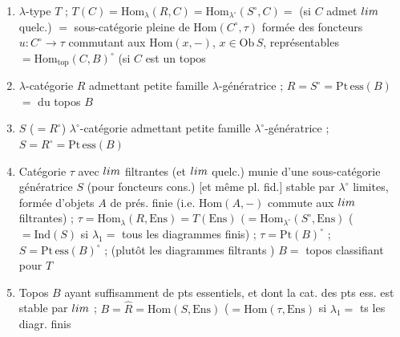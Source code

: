 \documentclass[11pt,a4paper]{article}
\begin{document}
\begin{enumerate}
  \item[{[T]}] $\lambda$-type $T$ ; $T(C) = \mathrm{Hom}_{\lambda}(R, C) =
    \mathrm{Hom}_{\lambda^{\circ}}(S^{\circ}, C) = $  (si $C$ admet $\varprojlim$ quelc.) $= $ sous-catégorie
    pleine de $\mathrm{Hom}(C^{\circ}, \tau)$ formée des foncteurs $u :
    C^{\circ} \to \tau$ commutant aux \ill{} $\mathrm{Hom}(x, -)$, $x \in
    \mathrm{Ob}\,S$, \ill{} représentables $= \mathrm{Hom}_{\mathrm{top}}
    (C, B)^{\circ}$ (si $C$ est un topos
  \item[{[R]}] $\lambda$-catégorie $R$ \struck{\ill{}} admettant petite
    famille $\lambda$-génératrice ; $R = S^{\circ} = \mathrm{Pt\,ess}(B)$
     $= $
    \struck{\ill{}} \ill{}  \ill{} du topos $B$
  \item[{[S]}] $S$ ($= R^{\circ}$) $\lambda^{\circ}$-catégorie admettant
    petite famille $\lambda^{\circ}$-génératrice ; $S = R^{\circ} =
    \mathrm{Pt\,ess}(B)$ 
  \item[{[$\tau$]}] Catégorie $\tau$ avec $\varinjlim$ filtrantes (et
    $\varprojlim$ quelc.) munie d'une sous-catégorie génératrice $S$
    (pour foncteurs cons.) [et même pl. fid.] stable par $\lambda^{\circ}$
     limites, formée d'objets $A$ de prés. finie (i.e.
    $\mathrm{Hom}(A, -)$ commute aux $\varinjlim$ filtrantes) ; $\tau =
    \mathrm{Hom}_{\lambda}(R, \mathrm{Ens}) = T(\mathrm{Ens})$
    $(= \mathrm{Hom}_{\lambda^{\circ}}(S^{\circ}, \mathrm{Ens})$
     ($=
    \mathrm{Ind}(S)$ si $\lambda_{1} = $ tous les diagrammes finis) ;
    $\tau = \mathrm{Pt}(B)^{\circ}$ ; $S = \mathrm{Pt\,ess}(B)^{\circ}$ ;
    (plutôt les diagrammes filtrants \ill{}) $B = $ topos classifiant pour
    $T$
  \item[{[B]}] \struck{\ill{}}  Topos $B$
    ayant suffisamment de pts essentiels, et dont la cat. des pts ess.
    est stable par $\varinjlim$ \ill{} ; $B = \hat{R} = \mathrm{Hom}(S,
    \mathrm{Ens})$ \struck{\ill{}} ($= \mathrm{Hom}(\tau, \mathrm{Ens})$
    si $\lambda_{1} = $ ts les diagr. finis
\end{enumerate}
\end{document}
